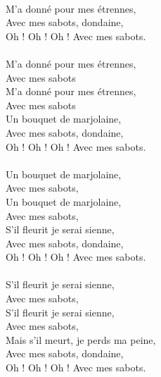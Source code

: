 \\M'a donné pour mes étrennes,
\\Avec mes sabots, dondaine,
\\Oh ! Oh ! Oh ! Avec mes sabots.
\\\\M'a donné pour mes étrennes,
\\Avec mes sabots
\\M'a donné pour mes étrennes,
\\Avec mes sabots
\\Un bouquet de marjolaine,
\\Avec mes sabots, dondaine,
\\Oh ! Oh ! Oh ! Avec mes sabots.
\\\\Un bouquet de marjolaine,
\\Avec mes sabots,
\\Un bouquet de marjolaine,
\\Avec mes sabots,
\\S'il fleurit je serai sienne,
\\Avec mes sabots, dondaine,
\\Oh ! Oh ! Oh ! Avec mes sabots.
\\\\S'il fleurit je serai sienne,
\\Avec mes sabots,
\\S'il fleurit je serai sienne,
\\Avec mes sabots,
\\Mais s'il meurt, je perds ma peine,
\\Avec mes sabots, dondaine,
\\Oh ! Oh ! Oh ! Avec mes sabots. 

\breakpage